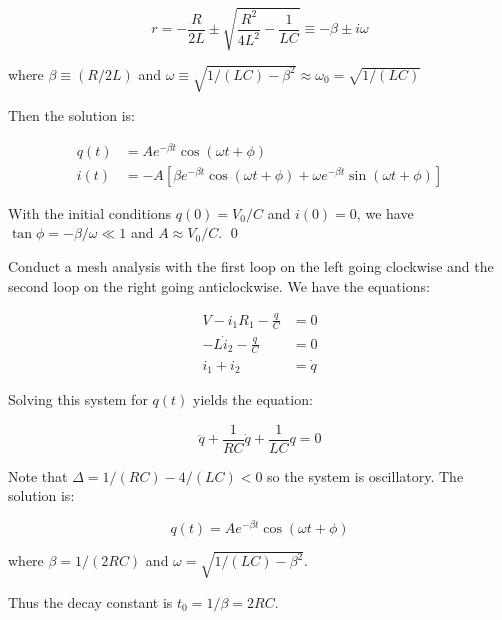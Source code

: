 \documentclass[12pt]{article}
\begin{document}
\begin{equation}
    r = -\frac{R}{2L} \pm \sqrt{\frac{R^{2}}{4L^{2}} - \frac{1}{LC}} \equiv -\beta \pm i \omega
\end{equation}

where $\beta \equiv (R/2L)$ and $\omega \equiv \sqrt{1/(LC) - \beta^{2}} \approx \omega_{0} = \sqrt{1/(LC)}$

Then the solution is:

\begin{equation}
\begin{split}
    q(t) &= A e^{-\beta t} \cos{(\omega t + \phi)} \\
    i(t) &= -A \left[ \beta e^{-\beta t} \cos{(\omega t + \phi)} + \omega e^{-\beta t} \sin{(\omega t + \phi)} \right]
\end{split}
\end{equation}

With the initial conditions $q(0) = V_{0}/C$ and $i(0) = 0$, we have $\tan{\phi} = -\beta/\omega \ll 1$ and $A \approx V_{0}/C$.
\qed


Conduct a mesh analysis with the first loop on the left going clockwise and the second loop on the right going anticlockwise. We have the equations:

\begin{equation}
\begin{split}
    V - i_{1}R_{1} - \frac{q}{C} &= 0 \\
    -L \dot{i}_{2} - \frac{q}{C} &= 0 \\
    i_{1} + i_{2} &= \dot{q}
\end{split}
\end{equation}

Solving this system for $q(t)$ yields the equation:

\begin{equation}
    \ddot{q} + \frac{1}{RC} \dot{q} + \frac{1}{LC} q = 0
\end{equation}

Note that $\Delta = 1/(RC) - 4/(LC) < 0$ so the system is oscillatory. The solution is:

\begin{equation}
    q(t) = A e^{-\beta t} \cos{(\omega t + \phi)}
\end{equation}

where $\beta = 1/(2RC)$ and $\omega = \sqrt{1/(LC) - \beta^{2}}$.

Thus the decay constant is $t_{0} = 1/\beta = 2RC$.
\end{document}
